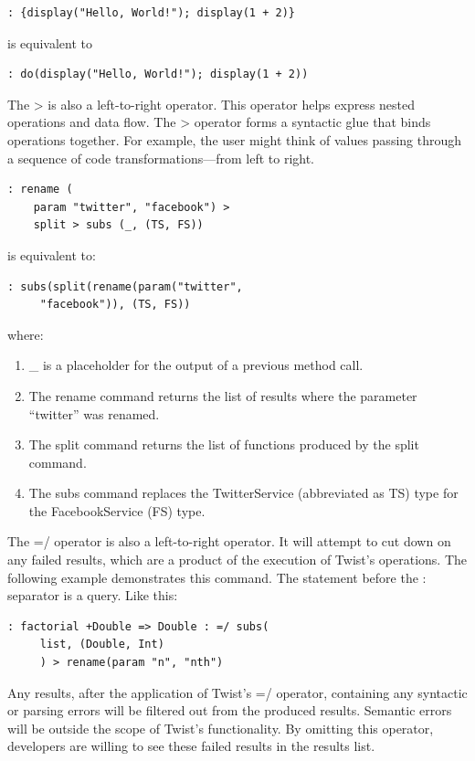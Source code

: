 \begin{verbatim}
: {display("Hello, World!"); display(1 + 2)}
\end{verbatim}

is equivalent to

\begin{verbatim}
: do(display("Hello, World!"); display(1 + 2))
\end{verbatim}

The > is also a left-to-right operator. This operator helps express nested operations and data flow.  The > operator forms a syntactic glue that binds operations together. For example, the user might think of values passing through a sequence of code transformations---from left to right.

\begin{verbatim}
: rename (
	param "twitter", "facebook") > 
	split > subs (_, (TS, FS))
\end{verbatim}

is equivalent to:

\begin{verbatim}
: subs(split(rename(param("twitter", 
	 "facebook")), (TS, FS))
\end{verbatim}

where:

\begin{enumerate}
	\item \_ is a placeholder for the output of a previous method call.
	\item The rename command returns the list of results where the parameter ``twitter'' was renamed.
	\item The split command returns the list of functions produced by the split command.
	\item The subs command replaces the TwitterService (abbreviated as TS) type for the 
	FacebookService (FS) type.
\end{enumerate}

The =/ operator is also a left-to-right operator. It will attempt to cut down on any failed results, which are a product of the execution of Twist's operations. The following example demonstrates this command. The statement before the : separator is a query. Like this:

\begin{verbatim}
: factorial +Double => Double : =/ subs(
	 list, (Double, Int)
	 ) > rename(param "n", "nth") 
\end{verbatim}

Any results, after the application of Twist's =/ operator, containing any syntactic or parsing errors will be filtered out from the produced results. Semantic errors will be outside the scope of Twist's functionality. By omitting this operator, developers are willing to see these failed results in the results list.

